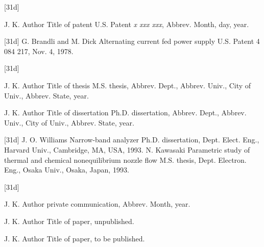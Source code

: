 \documentclass{IEEEtaes}
\begin{document}
\vspace*{-12pt}
\begin{thebibliography}{[31d]}
\item[] J. K. Author
\newblock Title of patent
\newblock U.S. Patent \emph{x xxx xxx}, Abbrev. Month, day, year.
\end{thebibliography}

\vspace*{-12pt}
\begin{thebibliography}{[31d]}
\setcounter{enumiv}{17}
   G. Brandli and M. Dick
\newblock Alternating current fed power supply
\newblock U.S. Patent 4 084 217, Nov. 4, 1978.
\end{thebibliography}

\vspace*{-12pt}
\begin{thebibliography}{[31d]}
\item[] J. K. Author
\newblock Title of thesis
\newblock M.S. thesis, Abbrev. Dept., Abbrev. Univ., City of Univ., Abbrev. State, year.
\item[] J. K. Author
\newblock Title of dissertation
\newblock Ph.D. dissertation, Abbrev. Dept., Abbrev. Univ., City of Univ., Abbrev. State, year.
\end{thebibliography}

\vspace*{-12pt}
\begin{thebibliography}{[31d]}
\setcounter{enumiv}{18}
J. O. Williams
\newblock Narrow-band analyzer
\newblock Ph.D. dissertation, Dept. Elect. Eng., Harvard Univ., Cambridge, MA, USA, 1993.
N. Kawasaki
\newblock Parametric study of thermal and chemical nonequilibrium nozzle flow
\newblock M.S. thesis, Dept. Electron. Eng., Osaka Univ., Osaka, Japan, 1993.
\end{thebibliography}

\vspace*{-12pt}
\begin{thebibliography}{[31d]}
\item[] J. K. Author
\newblock private communication, Abbrev. Month, year.
\item[] J. K. Author
\newblock Title of paper, unpublished.
\item[] J. K. Author
\newblock Title of paper, to be published.
\end{thebibliography}
\end{document}

